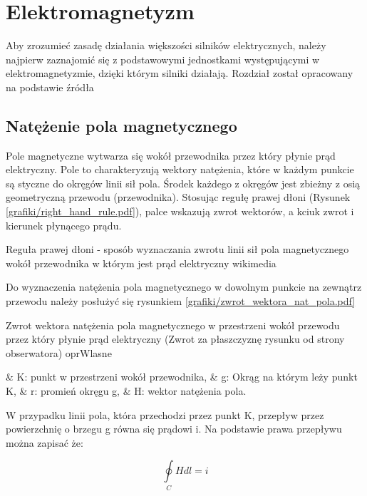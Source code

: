 \section{Elektromagnetyzm}

Aby zrozumieć zasadę działania większości silników elektrycznych, należy najpierw zaznajomić się z podstawowymi jednostkami występującymi w elektromagnetyzmie, dzięki którym silniki działają. Rozdział został opracowany na podstawie źródła \cite{jaszczuk}

\subsection{Natężenie pola magnetycznego}

Pole magnetyczne wytwarza się wokół przewodnika przez który płynie prąd elektryczny. Pole to charakteryzują wektory natężenia, które w każdym punkcie są styczne do okręgów linii sił pola. Środek każdego z okręgów jest zbieżny z osią geometryczną przewodu (przewodnika). Stosując regułę prawej dłoni (Rysunek \ref{grafiki/right_hand_rule.pdf}), palce wskazują zwrot wektorów, a kciuk zwrot i kierunek płynącego prądu.

	   {Reguła prawej dłoni - sposób wyznaczania zwrotu linii sił pola magnetycznego wokół przewodnika w którym jest prąd elektryczny}
	   {wikimedia}
	   
Do wyznaczenia natężenia pola magnetycznego w dowolnym punkcie na zewnątrz przewodu należy posłużyć się rysunkiem \ref{grafiki/zwrot_wektora_nat_pola.pdf}

	   {Zwrot wektora natężenia pola magnetycznego w przestrzeni wokół przewodu przez który płynie prąd elektryczny (Zwrot za płaszczyznę rysunku od strony obserwatora)}
	   {oprWlasne}
	   
\begin{easylist}
	& K: punkt w przestrzeni wokół przewodnika,
	& g: Okrąg na którym leży punkt K,
	& r: promień okręgu g,
	& H: wektor natężenia pola.
	\\
\end{easylist} 

W przypadku linii pola, która przechodzi przez punkt K, przepływ przez powierzchnię o brzegu g równa się prądowi i. Na podstawie prawa przepływu można zapisać że:

\begin{equation} \label{eq:natpol1}
	\oint\limits_C H dl = i
\end{equation}

